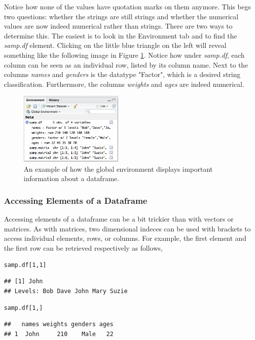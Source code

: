 \documentclass{report}\usepackage[]{graphicx}\usepackage[]{color}
\makeatletter
\newcommand{\hlnum}[1]{\textcolor[rgb]{0.686,0.059,0.569}{#1}}%
\newcommand{\hlstd}[1]{\textcolor[rgb]{0.345,0.345,0.345}{#1}}%
\newenvironment{kframe}{%
 \def\at@end@of@kframe{}%
 \ifinner\ifhmode%
  \def\at@end@of@kframe{\end{minipage}}%
  \begin{minipage}{\columnwidth}%
 \fi\fi%
 \def\FrameCommand##1{\hskip\@totalleftmargin \hskip-\fboxsep
 \colorbox{shadecolor}{##1}\hskip-\fboxsep
     \hskip-\linewidth \hskip-\@totalleftmargin \hskip\columnwidth}%
 \MakeFramed {\advance\hsize-\width
   \@totalleftmargin\z@ \linewidth\hsize
   \@setminipage}}%
 {\par\unskip\endMakeFramed%
 \at@end@of@kframe}
\newenvironment{knitrout}{}{} %
\makeatother
\begin{document}
Notice how none of the values have quotation marks on them anymore.  This begs two questions: whether the strings are still strings and whether the numerical values are now indeed numerical rather than strings.  There are two ways to determine this.  The easiest is to look in the Environment tab and to find the \textit{samp.df} element.  Clicking on the little blue triangle on the left will reveal something like the following image in Figure \ref{fig:dfcreate}.  Notice how under \textit{samp.df}, each column can be seen as an individual row, listed by its column name.  Next to the columns \textit{names} and \textit{genders} is the datatype "Factor", which is a desired string classification.  Furthermore, the columns \textit{weights} and \textit{ages} are indeed numerical.  

\begin{figure}[h!]
\centering
\includegraphics[width = 2in]{chapters/chapter_0/dfcreate.png}
\caption{An example of how the global environment displays important information about a dataframe.}
\label{fig:dfcreate}
\end{figure}


\subsubsection{Accessing Elements of a Dataframe} 
Accessing elements of a dataframe can be a bit trickier than with vectors or matrices.  As with matrices, two dimensional indeces can be used with brackets to access individual elements, rows, or columns.  For example, the first element and the first row can be retrieved respectively as follows, 

\begin{knitrout}
\color{fgcolor}\begin{kframe}
\begin{alltt}
\hlstd{samp.df[}\hlnum{1}\hlstd{,}\hlnum{1}\hlstd{]}
\end{alltt}
\begin{verbatim}
## [1] John
## Levels: Bob Dave John Mary Suzie
\end{verbatim}
\begin{alltt}
\hlstd{samp.df[}\hlnum{1}\hlstd{,]}
\end{alltt}
\begin{verbatim}
##   names weights genders ages
## 1  John     210    Male   22
\end{verbatim}
\end{kframe}
\end{knitrout}
\end{document}
